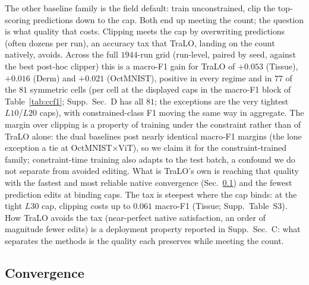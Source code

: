 \documentclass[letterpaper]{article} %
\begin{document}
The other baseline family is the field default: train unconstrained, clip the
top-scoring predictions down to the cap. Both end up meeting the count; the question
is what quality that costs. Clipping meets the cap by overwriting predictions (often
dozens per run), an accuracy tax that TraLO, landing on the count natively, avoids.
Across the full
$1944$-run grid (run-level, paired by seed, against the best post-hoc clipper)
this is a macro-F1 gain for TraLO of $+0.053$ (Tissue), $+0.016$ (Derm) and $+0.021$
(OctMNIST), positive in every regime and in $77$ of the $81$ symmetric cells
(per cell at the displayed caps in the macro-F1 block of Table~\ref{tab:ccf1};
Supp.~Sec.~D has all $81$; the exceptions are the very tightest $L10$/$L20$ caps), with
constrained-class F1 moving the same way in aggregate. The margin over clipping is a
property of training under the constraint rather than of TraLO alone: the dual
baselines post nearly identical macro-F1 margins (the lone exception a tie at
OctMNIST$\times$ViT), so we claim it for the constraint-trained family; constraint-time
training also adapts to the test batch, a confound we do not separate from avoided
editing. What is TraLO's
own is reaching that quality with the fastest and most reliable native convergence
(Sec.~\ref{sec:conv}) and the fewest prediction edits at binding caps. The tax is
steepest where the cap binds: at the tight $L30$ cap, clipping costs up to $0.061$
macro-F1 (Tissue; Supp.~Table~S3). How TraLO avoids the tax (near-perfect native
satisfaction, an order of magnitude fewer edits) is a deployment property reported in
Supp.~Sec.~C: what separates the methods is the quality each preserves while meeting
the count.

\subsection{Convergence}
\label{sec:conv}
\end{document}
